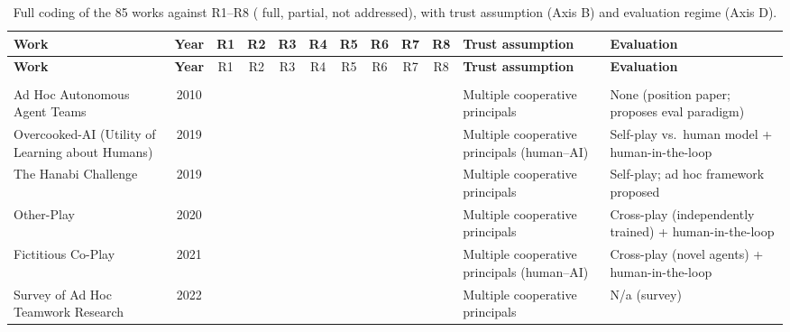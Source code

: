 \documentclass[conference]{IEEEtran}
\newcommand{\full}{{\small\CIRCLE}}
\newcommand{\half}{{\small\LEFTcircle}}
\newcommand{\none}{{\small\Circle}}
\begin{document}
\onecolumn
{\scriptsize
\setlength{\LTleft}{0pt plus 1fill}\setlength{\LTright}{0pt plus 1fill}
\setlength{\tabcolsep}{2.5pt}
\begin{longtable}{>{\raggedright\arraybackslash}p{4.2cm} c cccccccc >{\raggedright\arraybackslash}p{3.6cm} >{\raggedright\arraybackslash}p{4.4cm}}
\caption{Full coding of the 85 works against R1--R8 (\full{} full, \half{} partial, \none{} not addressed), with trust assumption (Axis B) and evaluation regime (Axis D).}\label{tab-master}\\
\toprule
\textbf{Work} & \textbf{Year} & R1 & R2 & R3 & R4 & R5 & R6 & R7 & R8 & \textbf{Trust assumption} & \textbf{Evaluation} \\
\midrule
\endfirsthead
\toprule
\textbf{Work} & \textbf{Year} & R1 & R2 & R3 & R4 & R5 & R6 & R7 & R8 & \textbf{Trust assumption} & \textbf{Evaluation} \\
\midrule
\endhead
\bottomrule
\endfoot
\multicolumn{12}{l}{\textit{AHT/ZSC}} \\
Ad Hoc Autonomous Agent Teams \cite{stone2010adhoc} & 2010 & \half{} & \none{} & \none{} & \none{} & \none{} & \none{} & \none{} & \none{} & Multiple cooperative principals & None (position paper; proposes eval paradigm) \\
Overcooked-AI (Utility of Learning about Humans) \cite{carroll2019overcooked} & 2019 & \full{} & \none{} & \none{} & \none{} & \none{} & \none{} & \none{} & \none{} & Multiple cooperative principals (human--AI) & Self-play vs.~human model + human-in-the-loop \\
The Hanabi Challenge \cite{bard2020hanabi} & 2019 & \half{} & \none{} & \none{} & \none{} & \none{} & \none{} & \none{} & \none{} & Multiple cooperative principals & Self-play; ad hoc framework proposed \\
Other-Play \cite{hu2020otherplay} & 2020 & \full{} & \none{} & \none{} & \none{} & \none{} & \none{} & \none{} & \none{} & Multiple cooperative principals & Cross-play (independently trained) + human-in-the-loop \\
Fictitious Co-Play \cite{strouse2021fcp} & 2021 & \full{} & \none{} & \none{} & \none{} & \none{} & \none{} & \none{} & \none{} & Multiple cooperative principals (human--AI) & Cross-play (novel agents) + human-in-the-loop \\
Survey of Ad Hoc Teamwork Research \cite{mirsky2022survey} & 2022 & \half{} & \none{} & \none{} & \none{} & \none{} & \none{} & \none{} & \none{} & Multiple cooperative principals & N/a (survey) \\

\end{longtable}}
\end{document}
